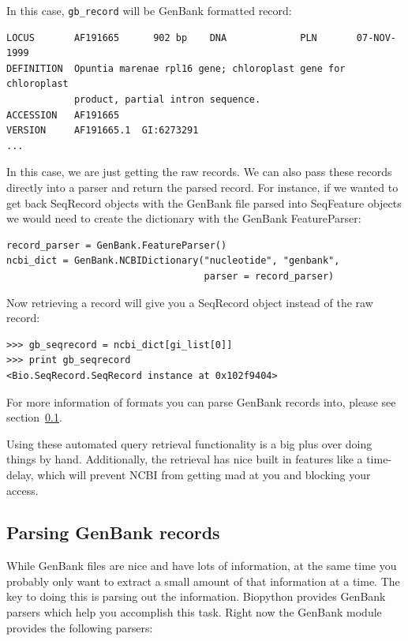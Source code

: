 \documentclass{report}
\begin{document}
In this case, \verb|gb_record| will be GenBank formatted record:

\begin{verbatim}
LOCUS       AF191665      902 bp    DNA             PLN       07-NOV-1999
DEFINITION  Opuntia marenae rpl16 gene; chloroplast gene for chloroplast
            product, partial intron sequence.
ACCESSION   AF191665
VERSION     AF191665.1  GI:6273291
...
\end{verbatim}

In this case, we are just getting the raw records. We can also pass these records directly into a parser and return the parsed record. For instance, if we wanted to get back SeqRecord objects with the GenBank file parsed into SeqFeature objects we would need to create the dictionary with the GenBank FeatureParser:

\begin{verbatim}
record_parser = GenBank.FeatureParser()
ncbi_dict = GenBank.NCBIDictionary("nucleotide", "genbank",
                                   parser = record_parser)
\end{verbatim}

Now retrieving a record will give you a SeqRecord object instead of the raw record:

\begin{verbatim}
>>> gb_seqrecord = ncbi_dict[gi_list[0]]
>>> print gb_seqrecord
<Bio.SeqRecord.SeqRecord instance at 0x102f9404>
\end{verbatim}

For more information of formats you can parse GenBank records into, please see section~\ref{sec:gb-parsing}.

Using these automated query retrieval functionality is a big plus over doing things by hand. Additionally, the retrieval has nice built in features like a time-delay, which will prevent NCBI from getting mad at you and blocking your access.

\subsection{Parsing GenBank records}
\label{sec:gb-parsing}

While GenBank files are nice and have lots of information, at the same time you probably only want to extract a small amount of that information at a time. The key to doing this is parsing out the information. Biopython provides GenBank parsers which help you accomplish this task. Right now the GenBank module provides the following parsers:
\end{document}
